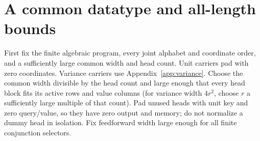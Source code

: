 \documentclass[10pt]{article}
\theoremstyle{remark}
\begin{document}
\section{A common datatype and all-length bounds}\label{app:datatype}
First fix the finite algebraic program, every joint alphabet and coordinate
order, and a sufficiently large common width and head count. Unit carriers
pad with zero coordinates. Variance carriers use Appendix~\ref{app:variance}.
Choose the common width divisible by the head count and large enough
that every head block fits its active rows and value columns (for variance
width $4r^2$, choose $r$ a sufficiently large multiple of that count).
Pad unused heads with unit key and zero query/value, so they have zero output
and memory; do not normalize a dummy head in isolation. Fix feedforward width
large enough for all finite conjunction selectors.
\end{document}

